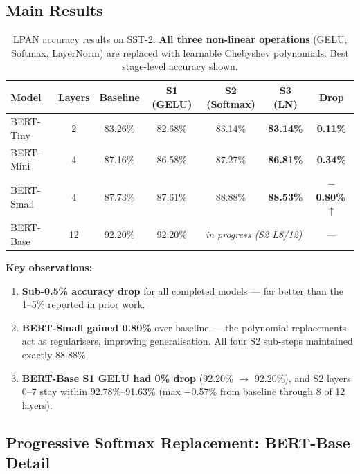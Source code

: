 \documentclass[12pt, a4paper]{article}
\begin{document}
\subsection{Main Results}

\begin{table}[ht]
\centering
\caption{LPAN accuracy results on SST-2. \textbf{All three non-linear operations} (GELU, Softmax, LayerNorm) are replaced with learnable Chebyshev polynomials. Best stage-level accuracy shown.}
\label{tab:main_results}
\renewcommand{\arraystretch}{1.35}
\begin{tabular}{lcccccc}
\toprule
\textbf{Model} & \textbf{Layers} & \textbf{Baseline} & \textbf{S1 (GELU)} & \textbf{S2 (Softmax)} & \textbf{S3 (LN)} & \textbf{Drop} \\
\midrule
BERT-Tiny  & 2  & 83.26\% & 82.68\% & 83.14\% & \textbf{83.14\%} & \textcolor{contributiongreen}{\textbf{0.11\%}} \\
BERT-Mini  & 4  & 87.16\% & 86.58\% & 87.27\% & \textbf{86.81\%} & \textcolor{contributiongreen}{\textbf{0.34\%}} \\
BERT-Small & 4  & 87.73\% & 87.61\% & 88.88\% & \textbf{88.53\%} & \textcolor{contributiongreen}{\textbf{$-$0.80\%}\,$\uparrow$} \\
\rowcolor{yellow!10}
BERT-Base  & 12 & 92.20\% & 92.20\% & \multicolumn{2}{c}{\textit{in progress (S2 L8/12)}} & --- \\
\bottomrule
\end{tabular}
\end{table}

\noindent\textbf{Key observations:}
\begin{enumerate}[leftmargin=2em]
  \item \textbf{Sub-0.5\% accuracy drop} for all completed models --- far better than the 1--5\% reported in prior work.
  \item \textbf{BERT-Small gained 0.80\%} over baseline --- the polynomial replacements act as regularisers, improving generalisation. All four S2 sub-steps maintained exactly 88.88\%.
  \item \textbf{BERT-Base S1 GELU had 0\% drop} (92.20\% $\to$ 92.20\%), and S2 layers 0--7 stay within 92.78\%--91.63\% (max $-$0.57\% from baseline through 8 of 12 layers).
\end{enumerate}

\subsection{Progressive Softmax Replacement: BERT-Base Detail}
\end{document}
